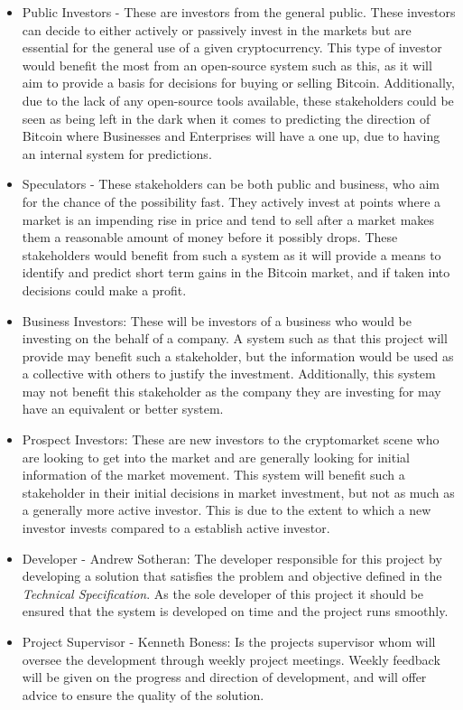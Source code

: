 \documentclass[oneside, 10pt]{article}
\begin{document}
		\begin{itemize}
			\item Public Investors - These are investors from the general public. These investors can decide to either actively or passively invest in the markets but are essential for the general use of a given cryptocurrency. This type of investor would benefit the most from an open-source system such as this, as it will aim to provide a basis for decisions for buying or selling Bitcoin. Additionally, due to the lack of any open-source tools available, these stakeholders could be seen as being left in the dark when it comes to predicting the direction of Bitcoin where Businesses and Enterprises will have a one up, due to having an internal system for predictions.
			\item Speculators - These stakeholders can be both public and business, who aim for the chance of the possibility fast. They actively invest at points where a market is an impending rise in price and tend to sell after a market makes them a reasonable amount of money before it possibly drops. These stakeholders would benefit from such a system as it will provide a means to identify and predict short term gains in the Bitcoin market, and if taken into decisions could make a profit.
			\item Business Investors: These will be investors of a business who would be investing on the behalf of a company. A system such as that this project will provide may benefit such a stakeholder, but the information would be used as a collective with others to justify the investment. Additionally, this system may not benefit this stakeholder as the company they are investing for may have an equivalent or better system.
			\item Prospect Investors: These are new investors to the cryptomarket scene who are looking to get into the market and are generally looking for initial information of the market movement. This system will benefit such a stakeholder in their initial decisions in market investment, but not as much as a generally more active investor. This is due to the extent to which a new investor invests compared to a establish active investor.
			
			\item Developer - Andrew Sotheran: The developer responsible for this project by developing a solution that satisfies the problem and	objective defined in the \textit{Technical Specification}. As the sole developer of this project it should be ensured that the system is developed on time and the project runs smoothly.
			\item Project Supervisor - Kenneth Boness: Is the projects supervisor whom will oversee the development through weekly project meetings. Weekly feedback will be given on the progress and direction of development, and will offer advice to ensure the quality of the solution.
		\end{itemize}
		
\end{document}
